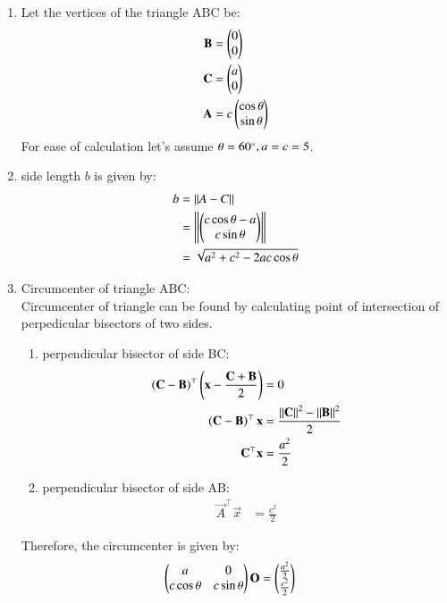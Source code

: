 \documentclass[journal,12pt,twocolumn]{IEEEtran}
\begin{document}
\begin{enumerate}

\item Let the vertices of the triangle ABC be:
	\begin{align}
		\mathbf{B} &= \begin{pmatrix}0\\0\end{pmatrix}\\
		\mathbf{C} &= \begin{pmatrix}a\\0\end{pmatrix}\\
		\mathbf{A} &= c\begin{pmatrix}\cos{\theta}\\ \sin{\theta}\end{pmatrix}
	\end{align}
	For ease of calculation let's assume $\theta = 60{\degree}, a = c = 5$.

\item side length $b$ is given by:
	\begin{align}
		b &= \left\lVert A-C\right\rVert\\
		&= \left\lVert \begin{pmatrix} c\cos{\theta} - a \\ c\sin{\theta}\end{pmatrix}\right\rVert \\
		&= \sqrt{a^2 + c^2 - 2ac \cos{\theta}}\\
	\end{align}

\item Circumcenter of triangle ABC:\\
	Circumcenter of triangle can be found by calculating point of intersection of perpedicular bisectors of two sides.
	\begin{enumerate}
	\item perpendicular bisector of side BC:
		\begin{align}
			\left(\mathbf{C}-\mathbf{B}\right)^{\top}\left(\mathbf{x}- \frac{\mathbf{C}+\mathbf{B}}{2}\right) &= 0\\
			\left(\mathbf{C}-\mathbf{B}\right)^{\top} \mathbf{x} &= \frac{\left\lVert\mathbf{C}\right\rVert^2 -\left\lVert\mathbf{B}\right\rVert^2}{2}\\
			\mathbf{C}^{\top}\mathbf{x} &= \frac{a^2}{2} 
		\end{align}
	\item perpendicular bisector of side AB:
		\begin{align}
			\vec{A}^{\top}\vec{x} &= \frac{c^2}{2}
		\end{align}
	\end{enumerate}
	
	Therefore, the circumcenter is given by:
		\begin{align}
			\begin{pmatrix} a & 0\\ c \cos{\theta} & c \sin{\theta}\end{pmatrix} \mathbf{O} &= \begin{pmatrix} \frac{a^2}{2} \\ \frac{c^2}{2}\end{pmatrix}
		\end{align}


\end{enumerate}
\end{document}
